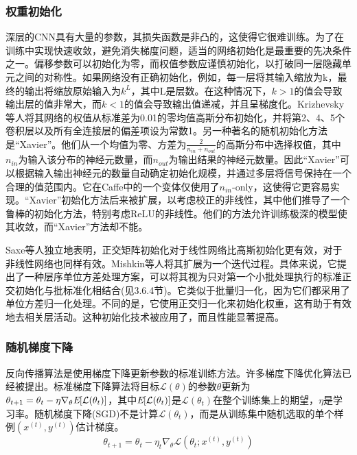 \documentclass[final]{cvpr}
\begin{document}
\subsubsection{权重初始化}
深层的CNN具有大量的参数，其损失函数是非凸的，这使得它很难训练。为了在训练中实现快速收敛，避免消失梯度问题，适当的网络初始化是最重要的先决条件之一。偏移参数可以初始化为零，而权值参数应谨慎初始化，以打破同一层隐藏单元之间的对称性。如果网络没有正确初始化，例如，每一层将其输入缩放为k，最终的输出将缩放原始输入为$k^L$，其中L是层数。在这种情况下，$k > 1$的值会导致输出层的值非常大，而$k < 1$的值会导致输出值递减，并且呈梯度化。Krizhevsky等人将其网络的权值从标准差为0.01的零均值高斯分布初始化，并将第2、4、5个卷积层以及所有全连接层的偏差项设为常数1。另一种著名的随机初始化方法是``Xavier''。他们从一个均值为零、方差为$\frac{2}{n_{in}+n_{out}}$的高斯分布中选择权值，其中$n_{in}$为输入该分布的神经元数量，而$n_{out}$为输出结果的神经元数量。因此``Xavier''可以根据输入输出神经元的数量自动确定初始化规模，并通过多层将信号保持在一个合理的值范围内。它在Caffe中的一个变体仅使用了$n_{in}$-only，这使得它更容易实现。``Xavier''初始化方法后来被扩展，以考虑校正的非线性，其中他们推导了一个鲁棒的初始化方法，特别考虑ReLU的非线性。他们的方法允许训练极深的模型使其收敛，而``Xavier''方法却不能。

Saxe等人独立地表明，正交矩阵初始化对于线性网络比高斯初始化更有效，对于非线性网络也同样有效。Mishkin等人将其扩展为一个迭代过程。具体来说，它提出了一种层序单位方差处理方案，可以将其视为只对第一个小批处理执行的标准正交初始化与批标准化相结合(见3.6.4节)。它类似于批量归一化，因为它们都采用了单位方差归一化处理。不同的是，它使用正交归一化来初始化权重，这有助于有效地去相关层活动。这种初始化技术被应用了，而且性能显著提高。

\subsubsection{随机梯度下降}
反向传播算法是使用梯度下降更新参数的标准训练方法。许多梯度下降优化算法已经被提出。标准梯度下降算法将目标$\mathcal{L}(\theta)$的参数$\theta$更新为$\theta_{t+1} = \theta_t-\eta\nabla_\theta\emph{E}[\mathcal{L}(\theta_t)]$，其中$\emph{E}[\mathcal{L}(\theta_t)]$是$\mathcal{L}(\theta_t)$在整个训练集上的期望，$\eta$是学习率。随机梯度下降(SGD)不是计算$\mathcal{L}(\theta_t)$，而是从训练集中随机选取的单个样例$(x^{(t)},y^{(t)})$估计梯度。
\begin{equation}
	\theta_{t+1} = \theta_t-\eta_t\nabla_\theta\mathcal{L}(\theta_t;x^{(t)},y^{(t)})
\end{equation}
\end{document}
